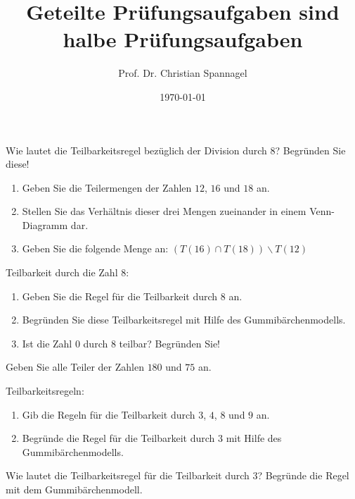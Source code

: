 \documentclass{cssheet}
\title{\Large Geteilte Prüfungsaufgaben sind halbe Prüfungsaufgaben}
\author{Prof. Dr. Christian Spannagel}
\date{\today}
\begin{document}
\printtitle

\begin{aufgabe}[WiSe 16/17]
	Wie lautet die Teilbarkeitsregel bezüglich der Division durch $8$? Begründen Sie
	diese!
\end{aufgabe}

\begin{aufgabe}[SoSe 17]
	\begin{enumerate}
		\item Geben Sie die Teilermengen der Zahlen $12$, $16$ und $18$ an.
		\item Stellen Sie das Verhältnis dieser drei Mengen zueinander in einem Venn-Diagramm dar.
		\item Geben Sie die folgende Menge an: $(T(16) \cap T(18)) \backslash T(12)$
	\end{enumerate}
\end{aufgabe}

\begin{aufgabe}[SoSe 22]
	Teilbarkeit durch die Zahl 8:
	\begin{enumerate}
		\item Geben Sie die Regel für die Teilbarkeit durch $8$ an.
		\item Begründen Sie diese Teilbarkeitsregel mit Hilfe des Gummibärchenmodells.
		\item Ist die Zahl $0$ durch $8$ teilbar? Begründen Sie!
	\end{enumerate}
\end{aufgabe}

\begin{aufgabe}[SoSe 22]
	Geben Sie alle Teiler der Zahlen $180$ und $75$ an.
\end{aufgabe}

\begin{aufgabe}[SoSe 23]
	Teilbarkeitsregeln:
	\begin{enumerate}
		\item Gib die Regeln für die Teilbarkeit durch $3$, $4$, $8$ und $9$ an.
		\item Begründe die Regel für die Teilbarkeit durch $3$ mit Hilfe des Gummibärchenmodells.
	\end{enumerate}
\end{aufgabe}

\begin{aufgabe}[WiSe 23/24]
	Wie lautet die Teilbarkeitsregel für die Teilbarkeit durch $3$? Begründe die Regel mit dem Gummibärchenmodell.
\end{aufgabe}
\end{document}

